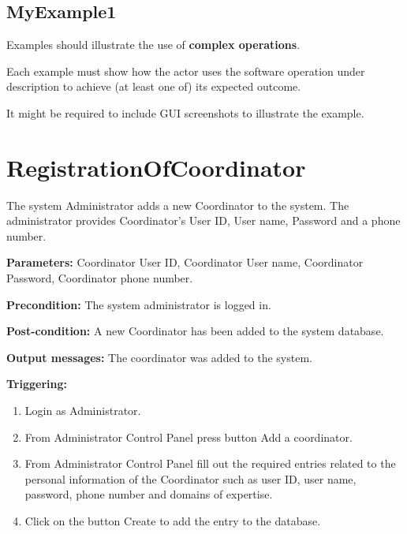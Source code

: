  
\subsection{MyExample1}
Examples should illustrate the use of \textbf{complex operations}.

Each example must show how the actor uses the software operation under
description to achieve (at least one of) its expected outcome.

It might be required to include GUI screenshots to illustrate the example.



\section{RegistrationOfCoordinator}
\label{operation:RegistrationOfCoordinator}
The system Administrator adds a new Coordinator to the system. The administrator 
provides Coordinator's User ID, User name, Password and a phone number.

\begin{description}

\item \textbf{Parameters:} Coordinator User ID, Coordinator User name,
Coordinator Password, Coordinator phone number.
\item \textbf{Precondition:} The system administrator is logged in.
\item \textbf{Post-condition:} A new Coordinator has been added to the system
database.
\item \textbf{Output messages:} The coordinator was added to the system.

\item \textbf{Triggering:}
\begin{enumerate}
\item Login as Administrator.
\item From Administrator Control Panel press button Add a coordinator.
\item From Administrator Control Panel fill out the required entries related to
the personal information of the Coordinator such as user ID, user name,
password, phone number and domains of expertise.
\item Click on the button Create to add the entry to the database.
\end{enumerate}
 
\end{description}


